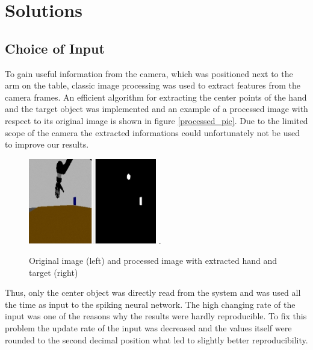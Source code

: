 \section{Solutions}
\subsection{Choice of Input}

To gain useful information from the camera, which was positioned next to the arm on the table, classic image processing was used to extract features from the camera frames. An efficient algorithm for extracting the center points of the hand and the target object was implemented and an example of a processed image with respect to its original image is shown in figure \ref{processed_pic}. Due to the limited scope of the camera the extracted informations could unfortunately not be used to improve our results.\\


\begin{figure}[H]
	\centering
	\includegraphics[width=2.2in]{img/image_processing.png}
	\DeclareGraphicsExtensions.
	\caption{Original image (left) and processed image with extracted hand and target (right)}
	\label{fig:processed_pic}
\end{figure}

Thus, only the center object was directly read from the system and was used all the time as input to the spiking neural network. The high changing rate of the input was one of the reasons why the results were hardly reproducible. To fix this problem the update rate of the input was decreased and the values itself were rounded to the second decimal position what led to slightly better reproducibility. 

